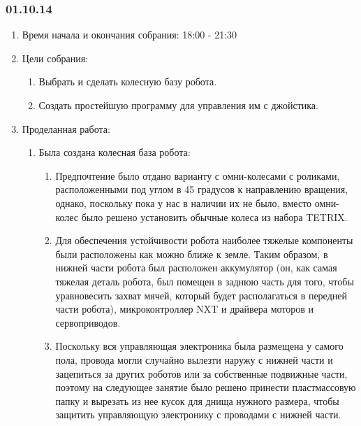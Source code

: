 
\subsubsection{01.10.14}

\begin{enumerate}
	\item Время начала и окончания собрания:
	18:00 - 21:30
	\item Цели собрания:
	\begin{enumerate}
		\item Выбрать и сделать колесную базу робота.
		
		\item Создать простейшую программу для управления им с джойстика.
		
	\end{enumerate}
	
	\item Проделанная работа:
	\begin{enumerate}
		\item Была создана колесная база робота:
		\begin{enumerate}
			\item Предпочтение было отдано варианту с омни-колесами с роликами, расположенными под углом в 45 градусов к направлению вращения, однако, поскольку пока у нас в наличии их не было, вместо омни-колес было решено установить обычные колеса из набора TETRIX.
			
			\item Для обеспечения устойчивости робота наиболее тяжелые компоненты были расположены как можно ближе к земле. Таким образом, в нижней части робота был расположен аккумулятор (он, как самая тяжелая деталь робота, был помещен в заднюю часть для того, чтобы уравновесить захват мячей, который будет располагаться в передней части робота), микроконтроллер NXT и драйвера моторов и сервоприводов.
			
			\item Поскольку вся управляющая электроника была размещена у самого пола, провода могли случайно вылезти наружу с нижней части и зацепиться за других роботов или за собственные подвижные части, поэтому на следующее занятие было решено принести пластмассовую папку и вырезать из нее кусок для днища нужного размера, чтобы защитить управляющую электронику с проводами с нижней части.
			

\end{enumerate}
\end{enumerate}
\end{enumerate}
